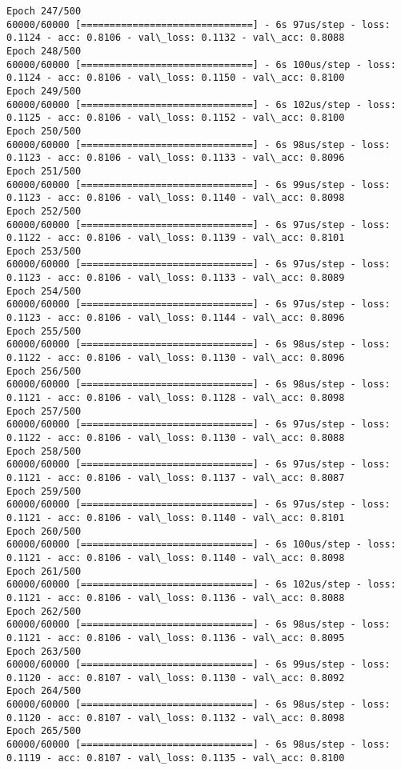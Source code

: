 \documentclass[11pt]{article}
\begin{document}
\begin{Verbatim}[commandchars=\\\{\}]
Epoch 247/500
60000/60000 [==============================] - 6s 97us/step - loss: 0.1124 - acc: 0.8106 - val\_loss: 0.1132 - val\_acc: 0.8088
Epoch 248/500
60000/60000 [==============================] - 6s 100us/step - loss: 0.1124 - acc: 0.8106 - val\_loss: 0.1150 - val\_acc: 0.8100
Epoch 249/500
60000/60000 [==============================] - 6s 102us/step - loss: 0.1125 - acc: 0.8106 - val\_loss: 0.1152 - val\_acc: 0.8100
Epoch 250/500
60000/60000 [==============================] - 6s 98us/step - loss: 0.1123 - acc: 0.8106 - val\_loss: 0.1133 - val\_acc: 0.8096
Epoch 251/500
60000/60000 [==============================] - 6s 99us/step - loss: 0.1123 - acc: 0.8106 - val\_loss: 0.1140 - val\_acc: 0.8098
Epoch 252/500
60000/60000 [==============================] - 6s 97us/step - loss: 0.1122 - acc: 0.8106 - val\_loss: 0.1139 - val\_acc: 0.8101
Epoch 253/500
60000/60000 [==============================] - 6s 97us/step - loss: 0.1123 - acc: 0.8106 - val\_loss: 0.1133 - val\_acc: 0.8089
Epoch 254/500
60000/60000 [==============================] - 6s 97us/step - loss: 0.1123 - acc: 0.8106 - val\_loss: 0.1144 - val\_acc: 0.8096
Epoch 255/500
60000/60000 [==============================] - 6s 98us/step - loss: 0.1122 - acc: 0.8106 - val\_loss: 0.1130 - val\_acc: 0.8096
Epoch 256/500
60000/60000 [==============================] - 6s 98us/step - loss: 0.1121 - acc: 0.8106 - val\_loss: 0.1128 - val\_acc: 0.8098
Epoch 257/500
60000/60000 [==============================] - 6s 97us/step - loss: 0.1122 - acc: 0.8106 - val\_loss: 0.1130 - val\_acc: 0.8088
Epoch 258/500
60000/60000 [==============================] - 6s 97us/step - loss: 0.1121 - acc: 0.8106 - val\_loss: 0.1137 - val\_acc: 0.8087
Epoch 259/500
60000/60000 [==============================] - 6s 97us/step - loss: 0.1121 - acc: 0.8106 - val\_loss: 0.1140 - val\_acc: 0.8101
Epoch 260/500
60000/60000 [==============================] - 6s 100us/step - loss: 0.1121 - acc: 0.8106 - val\_loss: 0.1140 - val\_acc: 0.8098
Epoch 261/500
60000/60000 [==============================] - 6s 102us/step - loss: 0.1121 - acc: 0.8106 - val\_loss: 0.1136 - val\_acc: 0.8088
Epoch 262/500
60000/60000 [==============================] - 6s 98us/step - loss: 0.1121 - acc: 0.8106 - val\_loss: 0.1136 - val\_acc: 0.8095
Epoch 263/500
60000/60000 [==============================] - 6s 99us/step - loss: 0.1120 - acc: 0.8107 - val\_loss: 0.1130 - val\_acc: 0.8092
Epoch 264/500
60000/60000 [==============================] - 6s 98us/step - loss: 0.1120 - acc: 0.8107 - val\_loss: 0.1132 - val\_acc: 0.8098
Epoch 265/500
60000/60000 [==============================] - 6s 98us/step - loss: 0.1119 - acc: 0.8107 - val\_loss: 0.1135 - val\_acc: 0.8100

\end{Verbatim}
\end{document}
